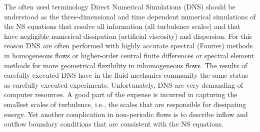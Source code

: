 

The often used terminology Direct Numerical Simulations (DNS) should be understood as the three-dimensional and time dependent numerical simulations of the NS equations that resolve all information (all turbulence scales) and that have negligible numerical dissipation (artificial viscosity) and dispersion. For this reason DNS are often performed with highly accurate spectral (Fourier) methods \cite{Canuto88} in homogeneous flows or higher-order central finite differences or spectral element methods \cite{semtex} for more geometrical flexibility in inhomogeneous flows. The results of carefully executed DNS have in the fluid mechanics community the same status as carefully executed experiments. Unfortunately, DNS are very demanding of computer resources. A good part of the expense is incurred in capturing the smallest scales of turbulence, i.e., the scales that are responsible for dissipating energy. Yet another complication in non-periodic flows is to describe inflow and outflow boundary conditions that are consistent with the NS equations.

